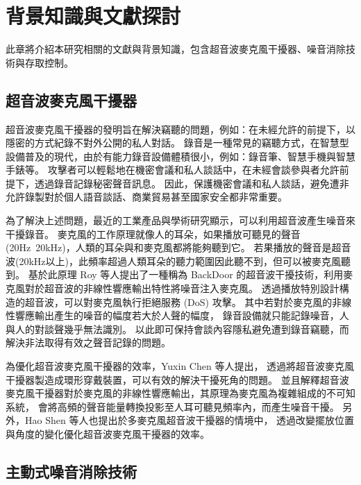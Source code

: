 \chapter{背景知識與文獻探討}\label{chapter:background}

    此章將介紹本研究相關的文獻與背景知識，包含超音波麥克風干擾器、噪音消除技術與存取控制。


\section{超音波麥克風干擾器}\label{section:background-jammer}

    超音波麥克風干擾器的發明旨在解決竊聽的問題，例如：在未經允許的前提下，以隱密的方式紀錄不對外公開的私人對話。
錄音是一種常見的竊聽方式，在智慧型設備普及的現代，由於有能力錄音設備體積很小，例如：錄音筆、智慧手機與智慧手錶等。
攻擊者可以輕鬆地在機密會議和私人談話中，在未經會談參與者允許前提下，透過錄音記錄秘密聲音訊息。
因此，保護機密會議和私人談話，避免遭非允許錄製對於個人語音談話、商業貿易甚至國家安全都非常重要。

    為了解決上述問題，最近的工業產品與學術研究\cite{chen2020wearable}顯示，可以利用超音波產生噪音來干擾錄音。
麥克風的工作原理就像人的耳朵，如果播放可聽見的聲音(20Hz~20kHz)，人類的耳朵與和麥克風都將能夠聽到它。
若果播放的聲音是超音波(20kHz以上)，此頻率超過人類耳朵的聽力範圍因此聽不到，但可以被麥克風聽到。
基於此原理 Roy 等人提出了一種稱為 BackDoor 的超音波干擾技術，利用麥克風對於超音波的非線性響應輸出特性將噪音注入麥克風。
透過播放特別設計構造的超音波，可以對麥克風執行拒絕服務 (DoS) 攻擊\cite{roy2017backdoor}。
其中若對於麥克風的非線性響應輸出產生的噪音的幅度若大於人聲的幅度，
錄音設備就只能記錄噪音，人與人的對談聲幾乎無法識別\cite{shen2019jamsys}。
以此即可保持會談內容隱私避免遭到錄音竊聽，而解決非法取得有效之聲音記錄的問題。

    為優化超音波麥克風干擾器的效率，Yuxin Chen 等人提出，
透過將超音波麥克風干擾器製造成環形穿戴裝置，可以有效的解決干擾死角的問題\cite{chen2020demonstrating}。
並且解釋超音波麥克風干擾器對於麥克風的非線性響應輸出，其原理為麥克風為複雜組成的不可知系統，
會將高頻的聲音能量轉換投影至人耳可聽見頻率內，而產生噪音干擾\cite{chen2019understanding}。
另外，Hao Shen 等人也提出於多麥克風超音波干擾器的情境中，
透過改變擺放位置與角度的變化優化超音波麥克風干擾器的效率\cite{shen2019jamsys}。


\section{主動式噪音消除技術}\label{section:background-anc}


